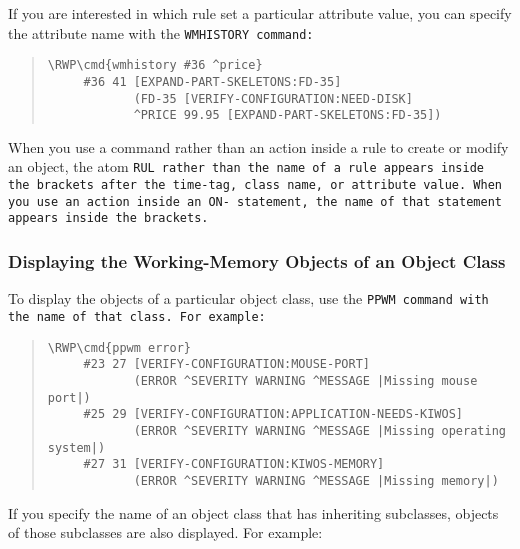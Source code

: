 If you are interested in which rule set a particular attribute value,
you can specify the attribute name with the \tt{WMHISTORY} command:
\begin{quote}
\begin{Verbatim}[commandchars=\\\{\}]
\RWP\cmd{wmhistory #36 ^price}
     #36 41 [EXPAND-PART-SKELETONS:FD-35]
            (FD-35 [VERIFY-CONFIGURATION:NEED-DISK]
            ^PRICE 99.95 [EXPAND-PART-SKELETONS:FD-35])
\end{Verbatim}
\end{quote}

When you use a command rather than an action inside a rule to create
or modify an object, the atom \tt{RUL} rather than the name of a rule
appears inside the brackets after the time-tag, class name, or
attribute value. When you use an action inside an \tt{ON-} statement,
the name of that statement appears inside the brackets.

\subsubsection{Displaying the Working-Memory Objects of an Object
  Class}

To display the objects of a particular object class, use the \tt{PPWM}
command with the name of that class. For example:

\begin{quote}
\begin{Verbatim}[commandchars=\\\{\}]
\RWP\cmd{ppwm error}
     #23 27 [VERIFY-CONFIGURATION:MOUSE-PORT]
            (ERROR ^SEVERITY WARNING ^MESSAGE |Missing mouse port|)
     #25 29 [VERIFY-CONFIGURATION:APPLICATION-NEEDS-KIWOS]
            (ERROR ^SEVERITY WARNING ^MESSAGE |Missing operating system|)
     #27 31 [VERIFY-CONFIGURATION:KIWOS-MEMORY]
            (ERROR ^SEVERITY WARNING ^MESSAGE |Missing memory|)
\end{Verbatim}
\end{quote}

If you specify the name of an object class that has inheriting
subclasses, objects of those subclasses are also displayed. For
example:

